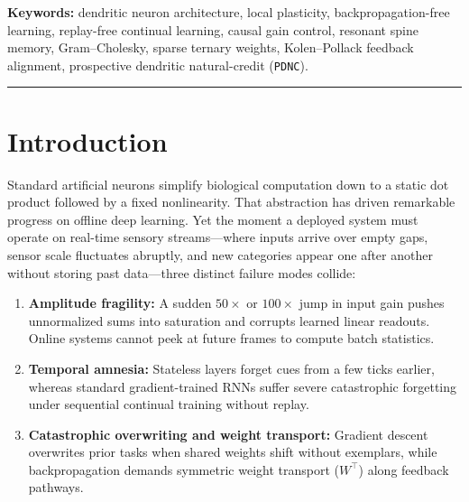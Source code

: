 \documentclass[11pt,a4paper]{article}
\begin{document}
\begin{abstract}
At the same time, our experiments mark honest boundaries where local learning still falls short. On raw $16\times 16$ Pixel Pong RL, unsupervised Motion-Oja Layer-1 training failed ($39.05\%$ vs.\ $45.30\%$ frozen), locking onto bright static paddles instead of the ball. Adding \texttt{PDNC} over $4\times 4$ overlapping patches ($4{,}851$ L1 synapses, $13.5\times$ fewer than flat) lifts Pixel Pong to \textbf{$72.25\% \pm 4.68\%$}, tying Flat Backprop A2C ($72.30\%$) and beating Patch Backprop A2C ($68.90\%$), yet falls $1.75\text{ pp}$ short of our pre-registered $74.0\%$ target, shows wider cross-seed variance ($\text{SD} = 10.69\%$), and loses continual accuracy when hidden Layer-1 drift stales readout curvature on compact \texttt{Split-FashionMNIST} ($70.13\%$ plastic vs.\ $80.72\%$ frozen).
\end{abstract}

\noindent\textbf{Keywords:} dendritic neuron architecture, local plasticity, backpropagation-free learning, replay-free continual learning, causal gain control, resonant spine memory, Gram--Cholesky, sparse ternary weights, Kolen--Pollack feedback alignment, prospective dendritic natural-credit (\texttt{PDNC}).

\vspace{0.3em}\hrule\vspace{0.5em}

\section{Introduction}

Standard artificial neurons simplify biological computation down to a static dot product followed by a fixed nonlinearity. That abstraction has driven remarkable progress on offline deep learning. Yet the moment a deployed system must operate on real-time sensory streams---where inputs arrive over empty gaps, sensor scale fluctuates abruptly, and new categories appear one after another without storing past data---three distinct failure modes collide:
\begin{enumerate}
    \item \textbf{Amplitude fragility:} A sudden $50\times$ or $100\times$ jump in input gain pushes unnormalized sums into saturation and corrupts learned linear readouts. Online systems cannot peek at future frames to compute batch statistics.
    \item \textbf{Temporal amnesia:} Stateless layers forget cues from a few ticks earlier, whereas standard gradient-trained RNNs suffer severe catastrophic forgetting under sequential continual training without replay.
    \item \textbf{Catastrophic overwriting and weight transport:} Gradient descent overwrites prior tasks when shared weights shift without exemplars, while backpropagation demands symmetric weight transport ($W^\top$) along feedback pathways.
\end{enumerate}
\end{document}

